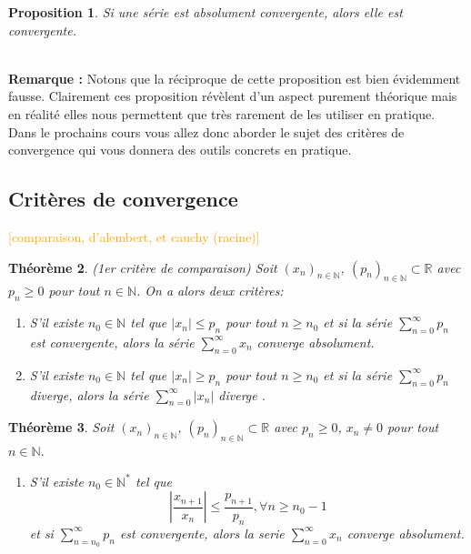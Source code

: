 \documentclass[a4paper, 12pt, french, twoside]{article}
\newtheorem{theorem}{Théorème}[section]
\newtheorem{proposition}[theorem]{Proposition}
\newcommand{\Nn}{{\mathbb{N}}}
\newcommand{\Rr}{{\mathbb{R}}}
\newcommand{\later}[1]{\textcolor{orange}{[#1]}}
\begin{document}
\begin{proposition}
    Si une série est absolument convergente, alors elle est convergente.
\end{proposition}
\newline 
\\ \textbf{Remarque :} Notons que la réciproque de cette proposition est bien évidemment fausse. \newline 
Clairement ces proposition révèlent d'un aspect purement théorique mais en réalité elles nous permettent que très rarement de les utiliser en pratique. Dans le prochains cours vous allez donc aborder le sujet des critères de convergence qui vous donnera des outils concrets en pratique. 
\hline 
\hline
\newpage
\subsection{Critères de convergence}
\later{comparaison, d'alembert, et cauchy (racine)}
\begin{theorem}
    (1er critère de comparaison)
    Soit $(x_n)_{n\in\Nn}$, $(p_n)_{n\in\Nn}\subset\Rr$ avec $p_n\geq0$ pour tout $n\in\Nn$.
    On a alors deux critères:
    \begin{enumerate}
        \item S'il existe $n_0 \in\Nn$ tel que $|x_n|\leq p_n$ pour tout $n\geq n_0$ et si la série $\sum_{n=0}^\infty p_n$ est convergente, alors la série $\sum_{n=0}^\infty x_n$ converge absolument.
       \item S'il existe $n_0 \in\Nn$ tel que $|x_n|\geq p_n$ pour tout $n\geq n_0$ et si la série $\sum_{n=0}^\infty p_n$ diverge, alors la série $\sum_{n=0}^\infty |x_n|$ diverge .
    \end{enumerate}
\end{theorem}

\begin{theorem}
    Soit $(x_n)_{n\in\Nn}$, $(p_n)_{n\in\Nn}\subset\Rr$ avec $p_n\geq0$, $x_n\neq 0$ pour tout $n\in\Nn$. 
    \begin{enumerate}
        \item S'il existe $n_0\in\Nn^*$ tel que
        \begin{equation*}
            |\frac{x_{n+1}}{x_n}|\leq \frac{p_{n+1}}{p_n}, \forall n \geq n_0-1
        \end{equation*}
        et si $\sum_{n=n_0}^\infty p_n$ est convergente, alors la serie $\sum_{n=0}^\infty x_n$ converge absolument.
    \end{enumerate}
\end{theorem}
\end{document}
